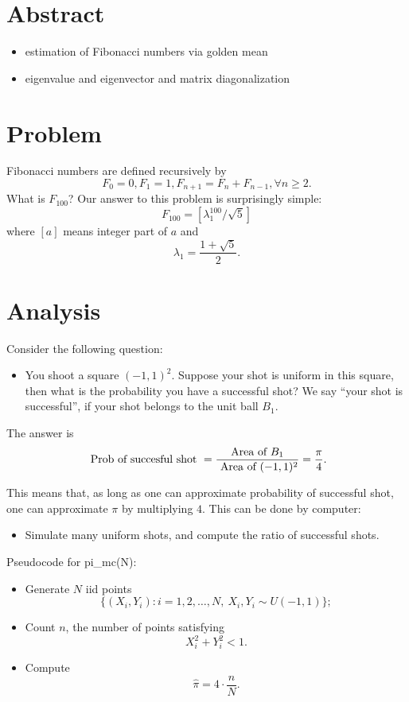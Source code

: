 \documentclass{article}
\begin{document}
\section{Abstract}
\begin{itemize}
 \item estimation of Fibonacci numbers via golden mean
 \item eigenvalue and eigenvector and matrix diagonalization
\end{itemize}

\section{Problem}
Fibonacci numbers are defined recursively by
$$F_{0} = 0, F_{1} = 1, F_{n+1} = F_{n} + F_{n-1}, \forall n\ge 2.$$
What is $F_{100}$?
Our answer to this problem is surprisingly simple:
$$F_{100} = [\lambda_{1}^{100}/\sqrt 5]$$
where $[a]$ means integer part of $a$ and 
$$\lambda_{1} = \frac{1+ \sqrt 5}{2}.$$

\section{Analysis}
Consider the following question:

\begin{itemize}
 \item You shoot a square $(-1, 1)^{2}$. Suppose your shot is uniform in this square, then what is the probability you have a successful shot? We say
 ``your shot is successful'', if your shot belongs to the unit ball $B_{1}$.
\end{itemize}

The answer is 
$$\hbox{ Prob of succesful shot } = \frac{\hbox{Area of  }B_{1}} { \hbox{ Area of }(-1, 1)^{2}} = \frac{\pi}{4} .$$


This means that, as long as one can approximate probability of successful shot, one can approximate $\pi$ by multiplying $4$. This can be done by computer: 
\begin{itemize}
\item Simulate many uniform shots, and compute the ratio of successful shots.
\end{itemize}


Pseudocode for pi\_mc(N):
\begin{itemize}
\item Generate $N$ iid points $$\{(X_i, Y_i): i = 1, 2, \ldots, N, \ X_i, Y_i \sim U(-1,1)\};$$
\item Count $n$, the number of points satisfying
$$X_i^2 + Y_i^2 <1.$$
\item Compute 
$$\hat \pi = 4 \cdot \frac{n}{N}.$$
\end{itemize}
\end{document}
